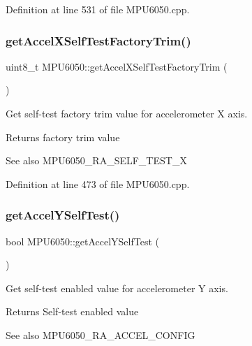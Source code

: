 Definition at line 531 of file M\+P\+U6050.\+cpp.

\mbox{\label{classMPU6050_a0cfaa7fbf63fb5867e003d490eb3fd96}} 
\subsubsection{\texorpdfstring{getAccelXSelfTestFactoryTrim()}{getAccelXSelfTestFactoryTrim()}}
{\footnotesize\ttfamily uint8\+\_\+t M\+P\+U6050\+::get\+Accel\+X\+Self\+Test\+Factory\+Trim (\begin{DoxyParamCaption}{ }\end{DoxyParamCaption})}



Get self-\/test factory trim value for accelerometer X axis. 

\begin{DoxyReturn}{Returns}
factory trim value 
\end{DoxyReturn}
\begin{DoxySeeAlso}{See also}
M\+P\+U6050\+\_\+\+R\+A\+\_\+\+S\+E\+L\+F\+\_\+\+T\+E\+S\+T\+\_\+X 
\end{DoxySeeAlso}


Definition at line 473 of file M\+P\+U6050.\+cpp.

\mbox{\label{classMPU6050_a2523e798db3baf9cb9dbf347af16639b}} 
\subsubsection{\texorpdfstring{getAccelYSelfTest()}{getAccelYSelfTest()}}
{\footnotesize\ttfamily bool M\+P\+U6050\+::get\+Accel\+Y\+Self\+Test (\begin{DoxyParamCaption}{ }\end{DoxyParamCaption})}



Get self-\/test enabled value for accelerometer Y axis. 

\begin{DoxyReturn}{Returns}
Self-\/test enabled value 
\end{DoxyReturn}
\begin{DoxySeeAlso}{See also}
M\+P\+U6050\+\_\+\+R\+A\+\_\+\+A\+C\+C\+E\+L\+\_\+\+C\+O\+N\+F\+IG 
\end{DoxySeeAlso}



